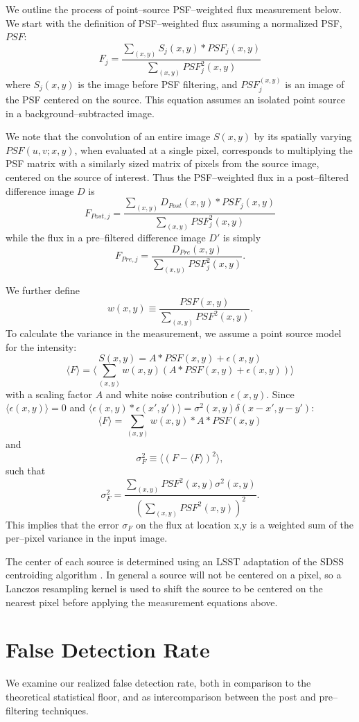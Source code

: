 \documentclass[floatfix, apj]{emulateapj}
\begin{document}
We outline the process of point--source PSF--weighted flux measurement below.
We start with the definition of PSF--weighted flux assuming a normalized PSF, $PSF$:
%
\[F_j = \frac{\sum_{(x,y)}S_j(x,y) * PSF_j(x,y)}{\sum_{(x,y)}PSF_j^2(x,y)}\]
%
where $S_j(x,y)$ is the image before PSF filtering, and $PSF_j^(x,y)$ is an image of the PSF centered on the source.
This equation assumes an isolated point source in a background--subtracted image.

We note that the convolution of an entire image $S(x,y)$ by its spatially varying $PSF(u,v;x,y)$, when evaluated at a single pixel, corresponds to multiplying the PSF matrix with a similarly sized matrix of pixels from the source image, centered on the source of interest.  Thus the PSF--weighted flux in a post--filtered difference image $D$ is 
%
\[F_{Post,j} = \frac{\sum_{(x,y)}D_{Post}(x,y) * PSF_j(x,y)}{\sum_{(x,y)}PSF_j^2(x,y)}\]
while the flux in a pre--filtered difference image $D'$ is simply
\[F_{Pre,j} = \frac{D_{Pre}(x,y)}{\sum_{(x,y)}PSF_j^2(x,y)}.\]

We further define
%
\[w(x,y) \equiv \frac{PSF(x,y)}{\sum_{(x,y)}PSF^2(x,y)}.\]
%
To calculate the variance in the measurement, we assume a point source model for the intensity:
%
\[S(x,y) = A * PSF(x,y) + \epsilon(x,y)\]
\[\langle F \rangle = \langle \sum_{(x,y)} w(x,y)(A * PSF(x,y) +\epsilon(x,y))\rangle\]
%
with a scaling factor $A$ and white noise contribution $\epsilon(x,y)$.
Since $\langle \epsilon(x,y) \rangle = 0$ and $\langle \epsilon(x,y) * \epsilon(x',y') \rangle = \sigma^2(x,y)\delta(x-x', y-y')$:
%
\[\langle F \rangle = \sum_{(x,y)} w(x,y) * A * PSF(x,y)\]
and
\[\sigma^2_F \equiv \langle(F - \langle F \rangle)^2\rangle,\]
such that
\[\sigma^2_F = \frac{\sum_{(x,y)}PSF^2(x,y)\sigma^2(x,y)}{(\sum_{(x,y)} PSF^2(x,y))^2}.\]
This implies that the error $\sigma_{F}$ on the flux at location x,y is a weighted sum of the per--pixel variance in the input image.

The center of each source is determined using an LSST adaptation of the SDSS centroiding algorithm \cite{photo}.
In general a source will not be centered on a pixel, so a Lanczos resampling kernel is used to shift the source to be centered on the nearest pixel before applying the measurement equations above.

\section{False Detection Rate}

We examine our realized false detection rate, both in comparison to the theoretical statistical floor, and as intercomparison between the post and pre--filtering techniques.
\end{document}
